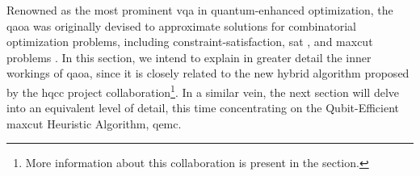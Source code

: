 






Renowned as the most prominent \acrshort{vqa} in quantum-enhanced optimization, the \acrshort{qaoa} \cite{farhi2014quantum} was originally devised to approximate solutions for combinatorial optimization problems, including constraint-satisfaction, \acrshort{sat} \cite{lin2016performance}, and \acrshort{maxcut} problems \cite{PhysRevA.97.022304}. In this section, we intend to explain in greater detail the inner workings of \acrshort{qaoa}, since it is closely related to the new hybrid algorithm proposed by the \acrshort{hqcc} project collaboration\footnote{More information about this collaboration is present in the  section.}. In a similar vein, the next section will delve into an equivalent level of detail, this time concentrating on the Qubit-Efficient \acrshort{maxcut} Heuristic Algorithm, \acrshort{qemc}.

